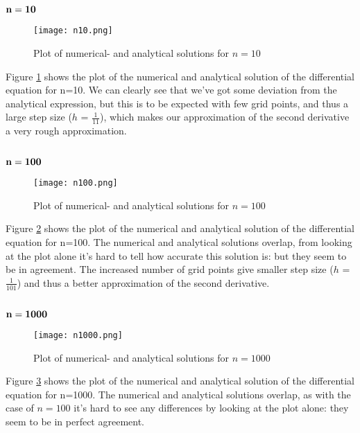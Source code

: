 \documentclass[norsk,a4paper,12pt]{article}
\begin{document}
\subsection*{$\bf{n=10}$}
\begin{figure}[ht!]
    \centering
    \texttt{[image: n10.png]}     
    \caption{Plot of numerical- and analytical solutions for $n = 10$}
    \label{fig:plot_n10}
\end{figure}

Figure \ref{fig:plot_n10} shows the plot of the numerical and analytical solution of the differential equation for n=10. We can clearly see that we've got some deviation from the analytical expression, but this is to be expected with few grid points, and thus a large step size ($h$ = $\frac{1}{11}$), which makes our approximation of the second derivative a very rough approximation.



\subsection*{$\bf{n=100}$}
\begin{figure}[ht!]
    \centering
    \texttt{[image: n100.png]}     
    \caption{Plot of numerical- and analytical solutions for $n = 100$}
    \label{fig:plot_n100}
\end{figure}

Figure \ref{fig:plot_n100} shows the plot of the numerical and analytical solution of the differential equation for n=100. The numerical and analytical solutions overlap, from looking at the plot alone it's hard to tell how accurate this solution is: but they seem to be in agreement. The increased number of grid points give smaller step size ($h$ = $\frac{1}{101}$) and thus a better approximation of the second derivative.

\subsection*{$\bf{n=1000}$}
\begin{figure}[ht!]
    \centering
    \texttt{[image: n1000.png]}     
    \caption{Plot of numerical- and analytical solutions for $n = 1000$}
    \label{fig:plot_n1000}
\end{figure}

Figure \ref{fig:plot_n1000} shows the plot of the numerical and analytical solution of the differential equation for n=1000. The numerical and analytical solutions overlap, as with the case of $n=100$ it's hard to see any differences by looking at the plot alone: they seem to be in perfect agreement.
 
\end{document}
